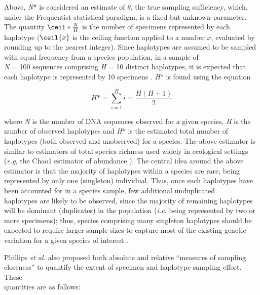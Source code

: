 Above, \textit{N}* is considered an estimate of $\theta$, the true sampling sufficiency, which, under the Frequentist statistical paradigm, is a fixed but unknown parameter. The quantity $\ceil*{\frac{N}{H}}$ is the number of specimens represented by each haplotype ($\ceil{x}$ is the ceiling function applied to a number $x$, evaluated by rounding up to the nearest integer). Since haplotypes are assumed to be sampled with equal frequency from a species population, in a sample of \\ \textit{N} = 100 sequences comprising \textit{H} = 10 distinct haplotypes, it is expected that each haplotype is represented by 10 specimens \cite{phillips2015exploration}. \textit{H}* is found using the equation

\begin{equation}
H\mbox{*}=\sum_{i=1}^H i = \frac{H(H+1)}{2}
\label{eqn}
\end{equation}

\vspace{1mm}

\noindent where \textit{N} is the number of DNA sequences observed for a given species, \textit{H} is the number of observed haplotypes and \textit{H}* is the estimated total number of haplotypes (both observed and unobserved) for a species. The above estimator is similar to estimators of total species richness used widely in ecological settings (\textit{e.g}, the Chao1 estimator of abundance \cite{chao1984nonparametric}). The central idea around the above estimator is that the majority of haplotypes within a species are rare, being represented by only one (singleton) individual. Thus, once such haplotypes have been accounted for in a species sample, few additional unduplicated \\ haplotypes are likely to be observed, since the majority of remaining haplotypes will be dominant (duplicates) in the population (\textit{i.e.} being represented by two or more specimens); thus, species comprising many singleton haplotypes should be expected to require larger sample sizes to capture most of the existing genetic variation for a given species of interest \cite{phillips2015exploration, williams2016early}.


  
Phillips \textit{et al.} \cite{phillips2015exploration} also proposed both absolute and relative ``measures of sampling closeness'' to quantify the extent of specimen and haplotype sampling effort. These \\ quantities are as follows:

